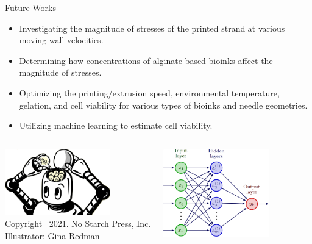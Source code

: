 \begin{frame}{Future Works}
\begin{block}{}
\begin{itemize}
    \item Investigating the magnitude of stresses of the printed strand at various moving wall velocities.
    \item Determining how concentrations of alginate-based bioinks affect the magnitude of stresses.
    \item Optimizing the printing/extrusion speed, environmental temperature, gelation, and cell viability for various types of bioinks and needle geometries.
    \item Utilizing machine learning to estimate cell viability.
    
    
\end{itemize}
\end{block}

\begin{columns}
\centering
\includegraphics[trim = 0mm 0mm 0mm 0mm, clip, width=1.8in]{./images/DL.png}
\\\tiny Copyright {\selectfont\textcopyright}\ 2021. No Starch Press, Inc.\\Illustrator: Gina Redman

\centering
{}

\centering
\includegraphics[trim = 0mm 0mm 0mm 0mm, clip, width=1.8in]{./images/NN.png}
\end{columns}
\end{frame}

